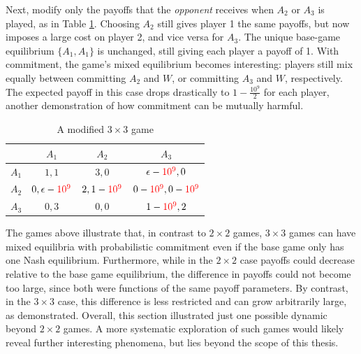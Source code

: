 \documentclass[main.tex]{subfiles}
\begin{document}
Next, modify only the payoffs that the \textit{opponent} receives when $A_2$ or $A_3$ is played, as in Table \ref{tab:3x3modified}. Choosing $A_2$ still gives player 1 the same payoffs, but now imposes a large cost on player 2, and vice versa for $A_3$. The unique base-game equilibrium $\{A_1,A_1\}$ is unchanged, still giving each player a payoff of 1. With commitment, the game's mixed equilibrium becomes interesting: players still mix equally between committing $A_2$ and $W$, or committing $A_3$ and $W$, respectively. The expected payoff in this case drops drastically to $1 - \frac{10^9}{2}$ for each player, another demonstration of how commitment can be mutually harmful.
\begin{table}[h!]
\centering
\begin{tabular}{c|ccc}
    & $A_1$ & $A_2$ & $A_3$ \\
    \hline
    $A_1$ & $1,1$ & $3,0$ & $\epsilon -\textcolor{red}{10^{9}},0$ \\
    $A_2$ & $0,\epsilon-\textcolor{red}{10^{9}}$ & $2,1-\textcolor{red}{10^{9}}$ & $0-\textcolor{red}{10^{9}},0-\textcolor{red}{10^{9}}$ \\
    $A_3$ & $0,3$ & $0,0$ & $1-\textcolor{red}{10^{9}},2$ \\
\end{tabular}
\caption{A modified $3\times3$ game}
\label{tab:3x3modified}
\end{table}
\newline
The games above illustrate that, in contrast to $2\times2$ games, $3\times3$ games can have mixed equilibria with probabilistic commitment even if the base game only has one Nash equilibrium. 
Furthermore, while in the $2 \times 2$ case payoffs could decrease relative to the base game equilibrium, the difference in payoffs could not become too large, since both were functions of the same payoff parameters. By contrast, in the $3 \times 3$ case, this difference is less restricted and can grow arbitrarily large, as demonstrated.
Overall, this section illustrated just one possible dynamic beyond $2\times2$ games. A more systematic exploration of such games would likely reveal further interesting phenomena, but lies beyond the scope of this thesis.
\end{document}
